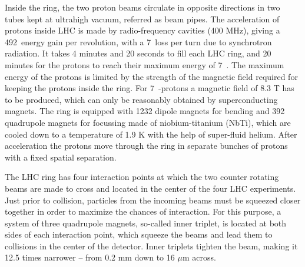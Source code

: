 Inside the ring, the two proton beams circulate in opposite directions in two tubes kept at ultrahigh vacuum, referred as beam pipes. The acceleration of protons inside LHC is made by radio-frequency cavities (400 MHz), giving a 492~\keV energy gain per revolution, with a 7~\keV loss per turn due to synchrotron radiation. It takes 4 minutes and 20 seconds to fill each LHC ring, and 20 minutes for the protons to reach their maximum energy of 7~\TeV. The maximum energy of the protons is limited by the strength of the magnetic field required for keeping the protons inside the ring. For 7~\TeV-protons a magnetic field of 8.3 T has to be produced, which can only be reasonably obtained by superconducting magnets. The ring is equipped with 1232 dipole magnets for bending and 392 quadrupole magnets for focussing made of niobium-titanium (NbTi), which are cooled down to a temperature of 1.9 K with the help of super-fluid helium.
After acceleration the protons move through the ring in separate bunches of protons with a fixed spatial separation.

The LHC ring has four interaction points at which the two counter rotating beams are made to cross and located in the center of the four LHC experiments. %
Just prior to collision, particles from the incoming beams must be squeezed closer together in order to maximize the chances of interaction. For this purpose, a system of three quadrupole magnets, so-called inner triplet, is located at both sides of each interaction point, which squeeze the beams and lead them to collisions in the center of the detector. Inner triplets tighten the beam, making it 12.5 times narrower – from 0.2 mm down to 16 $\mu$m across.

